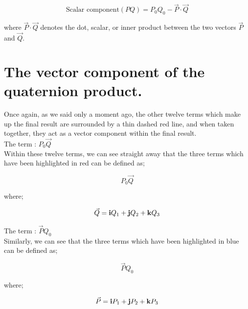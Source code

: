 \vspace{0.25\baselineskip}

\begin{equation*}
    \text{Scalar component}(PQ) = P_{0}Q_{0} - \vec{P} \cdot \vec{Q}
\end{equation*}
\vspace{0.0\baselineskip}

where \(\vec{P} \cdot \vec{Q}\) denotes the dot, scalar, or inner product between the two vectors \(\vec{P}\) and
\(\vec{Q}\).


\section{The vector component of the quaternion product.}

Once again, as we said only a moment ago, the other twelve terms which make up the final result are surrounded by a thin
dashed red line, and when taken together, they act as a vector component within the final result. \\

\textbullet \; The term : \(P_{0}\vec{Q}\) \\

Within these twelve terms, we can see straight away that the three terms which have been highlighted in red can be
defined as;

\begin{equation*}
    P_{0}\vec{Q}
\end{equation*}
\vspace{0.0\baselineskip}

where;

\begin{equation*}
    \vec{Q} = \bm{\mathrm{i}} Q_1 + \bm{\mathrm{j}} Q_2 + \bm{\mathrm{k}}Q_3
\end{equation*}
\vspace{0.0\baselineskip}

\textbullet \; The term : \(\vec{P}Q_{0}\) \\

Similarly, we can see that the three terms which have been highlighted in blue can be defined as;

\begin{equation*}
    \vec{P}Q_{0}
\end{equation*}

where;

\begin{equation*}
    \vec{P} = \bm{\mathrm{i}} P_1 + \bm{\mathrm{j}} P_2 + \bm{\mathrm{k}}P_3
\end{equation*}
\vspace{0.0\baselineskip}

